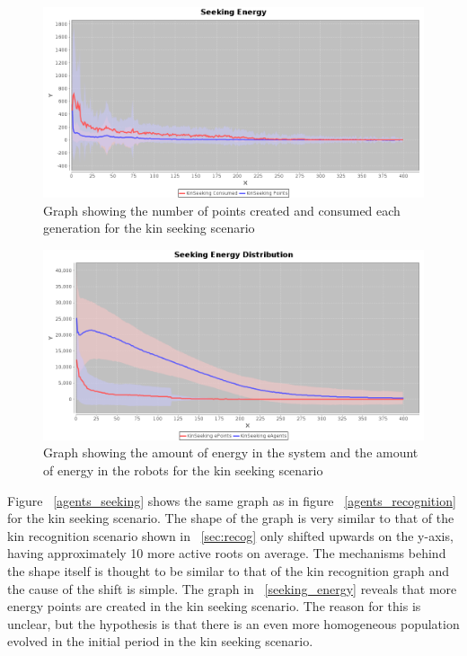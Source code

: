 \documentclass[a4paper]{book}
\begin{document}
\begin{figure}
	\includegraphics[width=\textwidth]{expr2/seeking_energy.png}
    \caption{Graph showing the number of points created and consumed each generation for the kin seeking scenario}
    \label{fig:points_seeking}
\end{figure}

\begin{figure}
\includegraphics[width=\textwidth]{expr2/seeking_distribution.png}
    \caption{Graph showing the amount of energy in the system and the amount of energy in the robots for the kin seeking scenario}
\label{fig:distribution_seeking}
\end{figure}

Figure ~\ref{agents_seeking} shows the same graph as in figure ~\ref{agents_recognition} for the kin seeking scenario.
The shape of the graph is very similar to that of the kin recognition scenario shown in ~\ref{sec:recog} only shifted upwards on the y-axis, having approximately 10 more active roots on average. The mechanisms behind the shape itself is thought to be similar to that of the kin recognition graph and the cause of the shift is simple. The graph in ~\ref{seeking_energy} reveals that more energy points are created in the kin seeking scenario. The reason for this is unclear, but the hypothesis is that there is an even more homogeneous population evolved in the initial period in the kin seeking scenario.   
\end{document}
